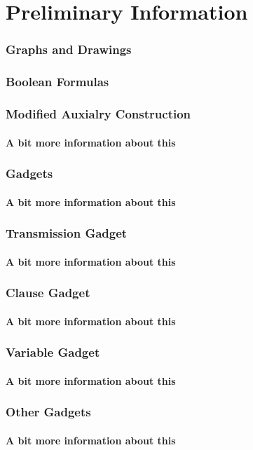 \documentclass{beamer}
\begin{document}
\section{Preliminary Information}
  \begin{frame}
    \frametitle{Graphs and Drawings}
  \end{frame}
  \begin{frame}
    \frametitle{Boolean Formulas}
  \end{frame}
  \begin{frame}
    \frametitle{Modified Auxialry Construction}
    \framesubtitle{A bit more information about this}
  \end{frame}
  \begin{frame}
    \frametitle{Gadgets}
    \framesubtitle{A bit more information about this}
  \end{frame}
  \begin{frame}
    \frametitle{Transmission Gadget}
    \framesubtitle{A bit more information about this}
  \end{frame}
  \begin{frame}
    \frametitle{Clause Gadget}
    \framesubtitle{A bit more information about this}
  \end{frame}
  \begin{frame}
    \frametitle{Variable Gadget}
    \framesubtitle{A bit more information about this}
  \end{frame}
  \begin{frame}
    \frametitle{Other Gadgets}
    \framesubtitle{A bit more information about this}
  \end{frame}
\end{document}
